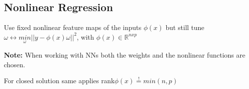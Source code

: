 \subsection{Nonlinear Regression}

Use fixed nonlinear feature maps of the inputs $\phi(x)$ but still tune $\omega \leftrightarrow \underset{\omega}{min} ||y - \phi(x)\omega||^2$, with $\phi(x) \in \mathbb{R}^{nxp}$

\textbf{Note: } When working with NNs both the weights and the nonlinear functions are chosen.

For closed solution same applies rank$\phi(x) \overset{!}{=} min(n,p)$